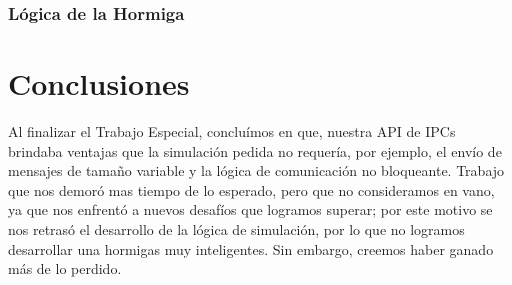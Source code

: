 \documentclass[a4paper,10pt]{article}
\begin{document}
\subsubsection{Lógica de la Hormiga}


\newpage
\section{Conclusiones}
Al finalizar el Trabajo Especial, concluímos en que, nuestra API de IPCs brindaba ventajas que la simulación pedida no requería, por ejemplo, el envío
de mensajes de tamaño variable y la lógica de comunicación no bloqueante. Trabajo que nos demoró mas tiempo de lo esperado, pero que no consideramos
en vano, ya que nos enfrentó a nuevos desafíos que logramos superar; por este motivo se nos retrasó el desarrollo de la lógica de simulación, por lo que
no logramos desarrollar una hormigas muy inteligentes. Sin embargo, creemos haber ganado más de lo perdido.

\bigskip
\end{document}
